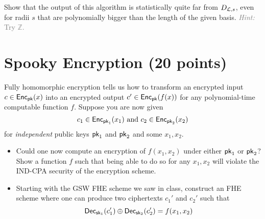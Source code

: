 \documentclass[11pt]{article}
\begin{document}
Show that the output of this algorithm is statistically quite far from $D_{\mathcal{L},s}$, even for
radii $s$ that are polynomially bigger than the length of the given basis.
\textcolor{gray}{{\em Hint:} Try $\mathbb{Z}$.}



\section{Spooky Encryption (20 points)}
\newcommand{\Spook}{\mathsf{Spook}}

Fully homomorphic encryption tells us how to transform an encrypted input $c \in \mathsf{Enc}_{\mathsf{pk}}(x)$ into an encrypted output $c' \in \mathsf{Enc}_{\mathsf{pk}}(f(x))$ for any polynomial-time computable function $f$. Suppose you are now given $$c_1 \in \mathsf{Enc}_{\mathsf{pk}_1}(x_1) \mbox{  and  } c_2 \in \mathsf{Enc}_{\mathsf{pk}_2}(x_2)$$ for {\em independent} public keys $\mathsf{pk}_1$ and $\mathsf{pk}_2$ and some $x_1,x_2$. 


\begin{itemize} 
\item  Could one now compute an encryption of $f(x_1,x_2)$ under either $\mathsf{pk}_1$ or $\mathsf{pk}_2$?  Show a function $f$ such that being able to do so for any $x_1,x_2$ will violate the IND-CPA security of the encryption scheme. 

\item Starting with the GSW FHE scheme we saw in class, construct an FHE scheme where one can produce two ciphertexts $c_1'$ and $c_2'$ such that 
$$ \mathsf{Dec}_{\mathsf{sk}_1}(c_1') \oplus \mathsf{Dec}_{\mathsf{sk}_2}(c_2') = f(x_1,x_2)$$
\end{itemize}
\end{document}
